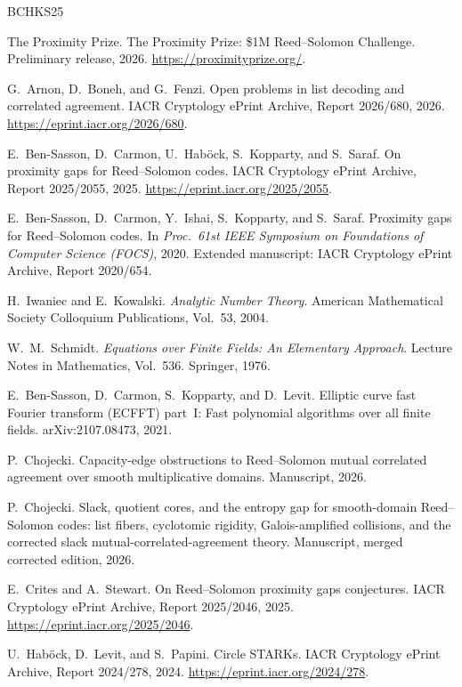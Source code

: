 \documentclass[11pt]{article}
\theoremstyle{definition}
\theoremstyle{remark}
\begin{document}
\begin{thebibliography}{BCHKS25}

The Proximity Prize.
\newblock The Proximity Prize: \$1M Reed--Solomon Challenge.
\newblock Preliminary release, 2026.
\newblock \url{https://proximityprize.org/}.


G.~Arnon, D.~Boneh, and G.~Fenzi.
\newblock Open problems in list decoding and correlated agreement.
\newblock IACR Cryptology ePrint Archive, Report 2026/680, 2026.
\newblock \url{https://eprint.iacr.org/2026/680}.

E.~Ben-Sasson, D.~Carmon, U.~Hab{\"o}ck, S.~Kopparty, and S.~Saraf.
\newblock On proximity gaps for Reed--Solomon codes.
\newblock IACR Cryptology ePrint Archive, Report 2025/2055, 2025.
\newblock \url{https://eprint.iacr.org/2025/2055}.


E.~Ben-Sasson, D.~Carmon, Y.~Ishai, S.~Kopparty, and S.~Saraf.
\newblock Proximity gaps for Reed--Solomon codes.
\newblock In \emph{Proc.\ 61st IEEE Symposium on Foundations of Computer Science (FOCS)}, 2020.
\newblock Extended manuscript: IACR Cryptology ePrint Archive, Report 2020/654.

H.~Iwaniec and E.~Kowalski.
\newblock \emph{Analytic Number Theory}.
\newblock American Mathematical Society Colloquium Publications, Vol.~53, 2004.

W.~M.~Schmidt.
\newblock \emph{Equations over Finite Fields: An Elementary Approach}.
\newblock Lecture Notes in Mathematics, Vol.~536. Springer, 1976.

E.~Ben-Sasson, D.~Carmon, S.~Kopparty, and D.~Levit.
\newblock Elliptic curve fast Fourier transform (ECFFT) part~I: Fast polynomial algorithms over all finite fields.
\newblock arXiv:2107.08473, 2021.

P.~Chojecki.
\newblock Capacity-edge obstructions to Reed--Solomon mutual correlated agreement over smooth multiplicative domains.
\newblock Manuscript, 2026.

P.~Chojecki.
\newblock Slack, quotient cores, and the entropy gap for smooth-domain Reed--Solomon codes: list fibers, cyclotomic rigidity, Galois-amplified collisions, and the corrected slack mutual-correlated-agreement theory.
\newblock Manuscript, merged corrected edition, 2026.

E.~Crites and A.~Stewart.
\newblock On Reed--Solomon proximity gaps conjectures.
\newblock IACR Cryptology ePrint Archive, Report 2025/2046, 2025.
\newblock \url{https://eprint.iacr.org/2025/2046}.

U.~Hab{\"o}ck, D.~Levit, and S.~Papini.
\newblock Circle STARKs.
\newblock IACR Cryptology ePrint Archive, Report 2024/278, 2024.
\newblock \url{https://eprint.iacr.org/2024/278}.

\end{thebibliography}
\end{document}
